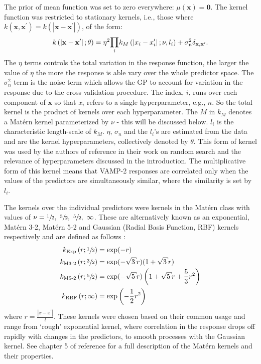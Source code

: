 The prior of mean function  was set to zero everywhere: $\mu(\mathbf{x})=\mathbf{0}$. The kernel function was restricted to stationary kernels, i.e., those where $k(\mathbf{x}, \mathbf{x}^{\prime}) = k(|\mathbf{x} - \mathbf{x}^{\prime}|)$, of the form: 
\begin{equation}\label{eqn:kernel_form}
    k\left(\left|\mathbf{x}-\mathbf{x}^{\prime}\right|; \theta\right) = 
    \eta^{2}\mathlarger{\prod}_i k_{M}\left(\left|x_{i}-x_{i}^{\prime}\right|; \nu, l_i\right)
    +\sigma_{n}^{2}\delta_{\mathbf{x}, \mathbf{x}^{\prime}}. 
\end{equation}
The $\eta$ terms controls the total variation in the response function, the larger the value of $\eta$ the more the response is able vary over the whole predictor space. The $\sigma_{n}^{2}$ term is the noise term which allows the GP to account for variation in the response due to the cross validation procedure.  The index, $i$, runs over each component of $\mathbf{x}$ so that $x_{i}$ refers to a single hyperparameter, e.g., $n$. So the total kernel is the product of kernels over each hyperparameter.  The $M$ in $k_{M}$ denotes a Mat\'ern kernel parameterized by $\nu$ - this will be discussed below. $l_{i}$ is the characteristic length-scale of $k_{M}$. $\eta$, $\sigma_{n}$ and the $l_{i}$'s are estimated from the data and are the kernel hyperparameters, collectively denoted by $\theta$. This form of kernel was used by the authors of reference  \cite{bergstrajamesbergstraRandomSearchHyperParameter2012} in their work on random search and the relevance of hyperparameters discussed in the introduction. The multiplicative form of this kernel means that VAMP-2 responses are correlated only when the values of the predictors are simultaneously similar, where the similarity is set by $l_{i}$.    

The kernels over the individual predictors were kernels in the Mat\'{e}rn class with values of $\nu=\sfrac{1}{2},\ \sfrac{3}{2},\ \sfrac{5}{2},\ \infty$. These are alternatively known as an exponential, Mat\'{e}rn 3-2, Mat\'{e}rn 5-2 and  Gaussian (Radial Basis Function, RBF) kernels respectively and are defined as follows \cite{rasmussenGaussianProcessesMachine2006}: 
\begin{align}
k_{\text{Exp}}\left(r; \sfrac{1}{2}\right) &=\exp (-r) \label{eqn:kern_exp}\\
k_{\text{M3-2}}\left(r; \sfrac{3}{2}\right) &= \exp (-\sqrt{3} r)(1+\sqrt{3} r) \label{eqn:kern_m32} \\
k_{\text{M5-2}}\left(r; \sfrac{5}{2}\right) &= \exp (-\sqrt{5} r)\left(1+\sqrt{5} r+\frac{5}{3} r^{2}\right) \label{eqn:kern_m52}\\
k_{\text{RBF}}\left(r; \infty\right) &= \exp \left(-\frac{1}{2} r^{2}\right) \label{eqn:kern_gauss}
\end{align}
where $r = \frac{|x-x^{\prime}|}{l}$. These kernels were chosen based on their common usage \cite{shahriariTakingHumanOut2016} and  range from `rough' exponential kernel, where correlation in the response drops off rapidly with changes in the predictors, to smooth processes with the Gaussian kernel. See chapter 5 of  reference \cite{rasmussenGaussianProcessesMachine2006} for a full description of the Mat\'{e}rn kernels and their properties.  

